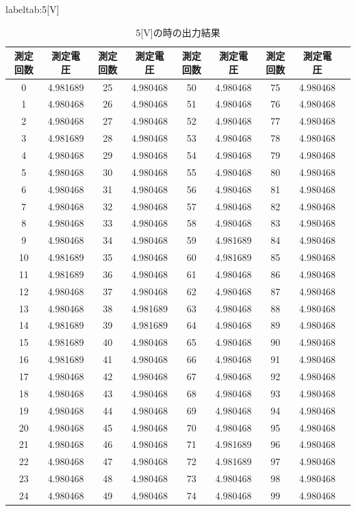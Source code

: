 \documentclass[11pt,dvipdfmx]{jarticle}
\begin{document}
			\begin{table}[b]
				\centering
				\caption{5[V]の時の出力結果}
				label{tab:5[V]}
				\begin{tabular}{|c|c|c|c|c|c|c|c|c|}
					\hline
					測定回数&測定電圧&測定回数&測定電圧&測定回数&測定電圧&測定回数&測定電圧\\
					\hline
				0  & 4.981689 & 25 & 4.980468 & 50 & 4.980468 & 75 & 4.980468 \\
				1  & 4.980468 & 26 & 4.980468 & 51 & 4.980468 & 76 & 4.980468 \\
				2  & 4.980468 & 27 & 4.980468 & 52 & 4.980468 & 77 & 4.980468 \\
				3  & 4.981689 & 28 & 4.980468 & 53 & 4.980468 & 78 & 4.980468 \\
				4  & 4.980468 & 29 & 4.980468 & 54 & 4.980468 & 79 & 4.980468 \\
				5  & 4.980468 & 30 & 4.980468 & 55 & 4.980468 & 80 & 4.980468 \\
				6  & 4.980468 & 31 & 4.980468 & 56 & 4.980468 & 81 & 4.980468 \\
				7  & 4.980468 & 32 & 4.980468 & 57 & 4.980468 & 82 & 4.980468 \\
				8  & 4.980468 & 33 & 4.980468 & 58 & 4.980468 & 83 & 4.980468 \\
				9  & 4.980468 & 34 & 4.980468 & 59 & 4.981689 & 84 & 4.980468 \\
				10 & 4.981689 & 35 & 4.980468 & 60 & 4.981689 & 85 & 4.980468 \\
				11 & 4.981689 & 36 & 4.980468 & 61 & 4.980468 & 86 & 4.980468 \\
				12 & 4.980468 & 37 & 4.980468 & 62 & 4.980468 & 87 & 4.980468 \\
				13 & 4.980468 & 38 & 4.981689 & 63 & 4.980468 & 88 & 4.980468 \\
				14 & 4.981689 & 39 & 4.981689 & 64 & 4.980468 & 89 & 4.980468 \\
				15 & 4.981689 & 40 & 4.980468 & 65 & 4.980468 & 90 & 4.980468 \\
				16 & 4.981689 & 41 & 4.980468 & 66 & 4.980468 & 91 & 4.980468 \\
				17 & 4.980468 & 42 & 4.980468 & 67 & 4.980468 & 92 & 4.980468 \\
				18 & 4.980468 & 43 & 4.980468 & 68 & 4.980468 & 93 & 4.980468 \\
				19 & 4.980468 & 44 & 4.980468 & 69 & 4.980468 & 94 & 4.980468 \\
				20 & 4.980468 & 45 & 4.980468 & 70 & 4.980468 & 95 & 4.980468 \\
				21 & 4.980468 & 46 & 4.980468 & 71 & 4.981689 & 96 & 4.980468 \\
				22 & 4.980468 & 47 & 4.980468 & 72 & 4.981689 & 97 & 4.980468 \\
				23 & 4.980468 & 48 & 4.980468 & 73 & 4.980468 & 98 & 4.980468 \\
				24 & 4.980468 & 49 & 4.980468 & 74 & 4.980468 & 99 & 4.980468\\
				\hline
				\end{tabular}
				\end{table}
\end{document}
